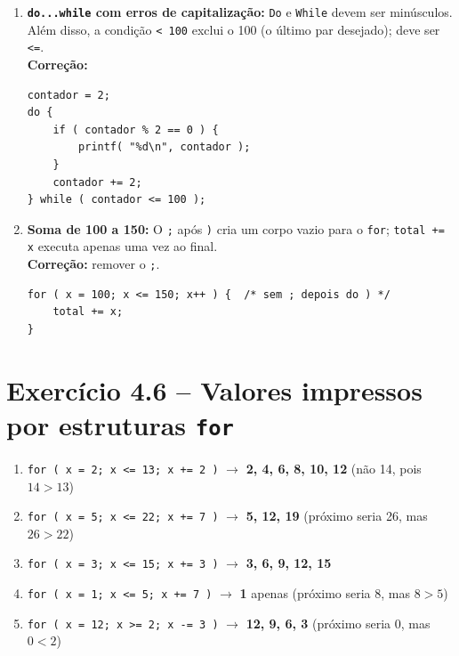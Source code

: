 \documentclass[12pt,a4paper]{article}
\begin{document}
\begin{respostabox}
\begin{enumerate}[label=\textbf{\alph*)}]
\item \textbf{\texttt{do...while} com erros de capitalização:} \texttt{Do} e \texttt{While}
devem ser minúsculos. Além disso, a condição \texttt{< 100} exclui o 100 (o último
par desejado); deve ser \texttt{<=}.\\
\textbf{Correção:}
\begin{lstlisting}
contador = 2;
do {
    if ( contador % 2 == 0 ) {
        printf( "%d\n", contador );
    }
    contador += 2;
} while ( contador <= 100 );
\end{lstlisting}

\item \textbf{Soma de 100 a 150:} O \texttt{;} após \texttt{)} cria um corpo vazio
para o \texttt{for}; \texttt{total += x} executa apenas uma vez ao final.\\
\textbf{Correção:} remover o \texttt{;}.
\begin{lstlisting}
for ( x = 100; x <= 150; x++ ) {  /* sem ; depois do ) */
    total += x;
}
\end{lstlisting}

\end{enumerate}
\end{respostabox}

\newpage

\section{Exercício 4.6 -- Valores impressos por estruturas \texttt{for}}

\begin{respostabox}
\begin{enumerate}[label=\textbf{\alph*)}]

\item \texttt{for ( x = 2; x <= 13; x += 2 )} \quad
$\to$ \textbf{2, 4, 6, 8, 10, 12} (não 14, pois $14 > 13$)

\item \texttt{for ( x = 5; x <= 22; x += 7 )} \quad
$\to$ \textbf{5, 12, 19} (próximo seria 26, mas $26 > 22$)

\item \texttt{for ( x = 3; x <= 15; x += 3 )} \quad
$\to$ \textbf{3, 6, 9, 12, 15}

\item \texttt{for ( x = 1; x <= 5; x += 7 )} \quad
$\to$ \textbf{1} apenas (próximo seria 8, mas $8 > 5$)

\item \texttt{for ( x = 12; x >= 2; x -= 3 )} \quad
$\to$ \textbf{12, 9, 6, 3} (próximo seria 0, mas $0 < 2$)

\end{enumerate}
\end{respostabox}
\end{document}
